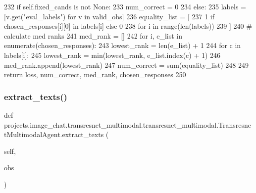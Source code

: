 \begin{DoxyCode}
232         \textcolor{keywordflow}{if} self.fixed\_cands \textcolor{keywordflow}{is} \textcolor{keywordflow}{not} \textcolor{keywordtype}{None}:
233             num\_correct = 0
234         \textcolor{keywordflow}{else}:
235             labels = [v.get(\textcolor{stringliteral}{"eval\_labels"}) \textcolor{keywordflow}{for} v \textcolor{keywordflow}{in} valid\_obs]
236             equality\_list = [
237                 1 \textcolor{keywordflow}{if} chosen\_responses[i][0] \textcolor{keywordflow}{in} labels[i] \textcolor{keywordflow}{else} 0
238                 \textcolor{keywordflow}{for} i \textcolor{keywordflow}{in} range(len(labels))
239             ]
240             \textcolor{comment}{# calculate med ranks}
241             med\_rank = []
242             \textcolor{keywordflow}{for} i, e\_list \textcolor{keywordflow}{in} enumerate(chosen\_responses):
243                 lowest\_rank = len(e\_list) + 1
244                 \textcolor{keywordflow}{for} c \textcolor{keywordflow}{in} labels[i]:
245                     lowest\_rank = min(lowest\_rank, e\_list.index(c) + 1)
246                 med\_rank.append(lowest\_rank)
247             num\_correct = sum(equality\_list)
248 
249         \textcolor{keywordflow}{return} loss, num\_correct, med\_rank, chosen\_responses
250 
\end{DoxyCode}
\mbox{\label{classprojects_1_1image__chat_1_1transresnet__multimodal_1_1transresnet__multimodal_1_1TransresnetMultimodalAgent_ac6efbef147b54cd3e5129b86df095687}} 
\subsubsection{\texorpdfstring{extract\+\_\+texts()}{extract\_texts()}}
{\footnotesize\ttfamily def projects.\+image\+\_\+chat.\+transresnet\+\_\+multimodal.\+transresnet\+\_\+multimodal.\+Transresnet\+Multimodal\+Agent.\+extract\+\_\+texts (\begin{DoxyParamCaption}\item[{}]{self,  }\item[{}]{obs }\end{DoxyParamCaption})}

